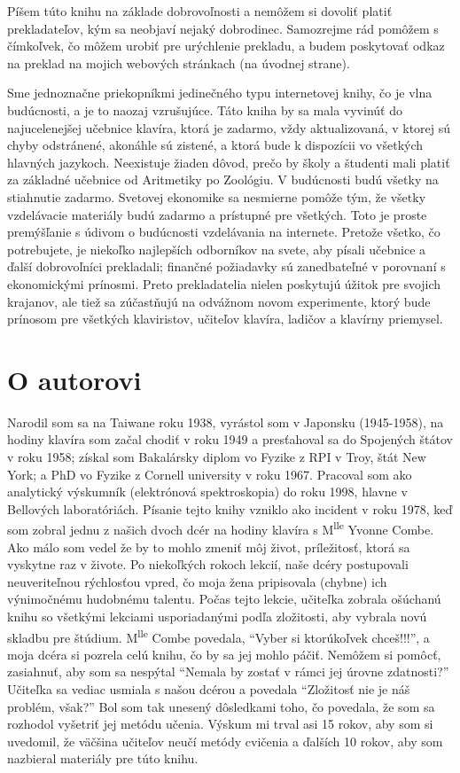 Píšem túto knihu na základe dobrovoľnosti a nemôžem si dovoliť platiť prekladateľov, kým sa neobjaví nejaký dobrodinec. Samozrejme rád pomôžem s čímkoľvek, čo môžem urobiť pre urýchlenie prekladu, a budem poskytovať odkaz na preklad na mojich webových stránkach (na úvodnej strane).
\medskip

Sme jednoznačne priekopníkmi jedinečného typu internetovej knihy, čo je vlna budúcnosti, a je to naozaj vzrušujúce. Táto kniha by sa mala vyvinúť do najucelenejšej učebnice klavíra, ktorá je zadarmo, vždy aktualizovaná, v ktorej sú chyby odstránené, akonáhle sú zistené, a ktorá bude k dispozícii vo všetkých hlavných jazykoch. Neexistuje žiaden dôvod, prečo by školy a študenti mali platiť za základné učebnice od Aritmetiky po Zoológiu. V budúcnosti budú všetky na stiahnutie zadarmo. Svetovej ekonomike sa nesmierne pomôže tým, že všetky vzdelávacie materiály budú zadarmo a prístupné pre všetkých. Toto je proste premýšľanie s údivom o budúcnosti vzdelávania na internete. Pretože všetko, čo potrebujete, je niekoľko najlepších odborníkov na svete, aby písali učebnice a ďalší dobrovoľníci prekladali; finančné požiadavky sú zanedbateľné v porovnaní s ekonomickými prínosmi. Preto prekladatelia nielen poskytujú úžitok pre svojich krajanov, ale tiež sa zúčastňujú na odvážnom novom experimente, ktorý bude prínosom pre všetkých klaviristov, učiteľov klavíra, ladičov a klavírny priemysel.

\chapter*{O autorovi}
Narodil som sa na Taiwane roku 1938, vyrástol som v Japonsku (1945-1958), na hodiny klavíra som začal chodiť v roku 1949 a presťahoval sa do Spojených štátov v roku 1958; získal som Bakalársky diplom  vo Fyzike z  RPI v Troy, štát New York; a PhD vo Fyzike z Cornell university v roku 1967.  Pracoval som ako analytický výskumník (elektrónová spektroskopia) do roku 1998, hlavne v Bellových laboratóriách. Písanie tejto knihy vzniklo ako incident v roku 1978, keď som zobral jednu z našich dvoch dcér na hodiny klavíra s M\textsuperscript{lle} Yvonne Combe. Ako málo som vedel že by to mohlo zmeniť môj život, príležitosť, ktorá sa vyskytne raz v živote. Po niekoľkých rokoch lekcií, naše dcéry postupovali neuveriteľnou rýchlosťou vpred, čo moja žena pripisovala (chybne) ich výnimočnému hudobnému talentu. Počas tejto lekcie, učiteľka zobrala ošúchanú knihu so všetkými lekciami usporiadanými podľa zložitosti, aby vybrala novú skladbu pre štúdium. M\textsuperscript{lle} Combe povedala, “Vyber si ktorúkoľvek chceš{\noligatures !!!}”, a moja dcéra si pozrela celú knihu, čo by sa jej mohlo páčiť. Nemôžem si pomôcť, zasiahnuť, aby som sa nespýtal “Nemala by zostať v rámci jej úrovne zdatnosti?” Učiteľka sa vediac usmiala s našou dcérou a povedala “Zložitosť nie je náš problém, však?” Bol som tak unesený dôsledkami toho, čo povedala, že som sa rozhodol vyšetriť jej metódu učenia. Výskum mi trval asi 15 rokov, aby som si uvedomil, že väčšina učiteľov neučí metódy cvičenia a ďalších 10 rokov, aby som nazbieral materiály pre túto knihu.
\medskip

